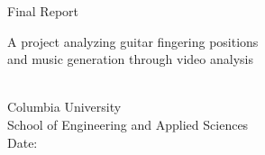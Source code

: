 \begin{titlepage}
    \begin{center}
        \vspace*{1cm}
        {\Huge
            \textbf{\Title}
        }
            
            \vspace{0.5cm}
            
        {\LARGE
            Final Report
        }
        
        \vspace{0.5cm}
        {\Large
            A project analyzing guitar fingering positions\\
            and music generation through video analysis
        }
        
        \vspace{1cm}
        
        \textbf{\Author}\\
        Columbia University\\
        School of Engineering and Applied Sciences\\
        Date: \Date
        
    \end{center}
\end{titlepage}
